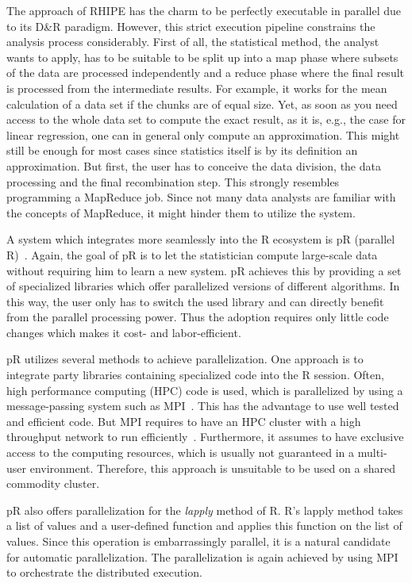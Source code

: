 The approach of RHIPE has the charm to be perfectly executable in parallel due to its D\&R paradigm.
However, this strict execution pipeline constrains the analysis process considerably.
First of all, the statistical method, the analyst wants to apply, has to be suitable to be split up into a map phase where subsets of the data are processed independently and a reduce phase where the final result is processed from the intermediate results.
For example, it works for the mean calculation of a data set if the chunks are of equal size.
Yet, as soon as you need access to the whole data set to compute the exact result, as it is, e.g., the case for linear regression, one can in general only compute an approximation.
This might still be enough for most cases since statistics itself is by its definition an approximation.
But first, the user has to conceive the data division, the data processing and the final recombination step.
This strongly resembles programming a MapReduce job.
Since not many data analysts are familiar with the concepts of MapReduce, it might hinder them to utilize the system.

A system which integrates more seamlessly into the R ecosystem is pR (parallel R)~\cite{samatova:2009a}.
Again, the goal of pR is to let the statistician compute large-scale data without requiring him to learn a new system.
pR achieves this by providing a set of specialized libraries which offer parallelized versions of different algorithms.
In this way, the user only has to switch the used library and can directly benefit from the parallel processing power.
Thus the adoption requires only little code changes which makes it cost- and labor-efficient.

pR utilizes several methods to achieve parallelization.
One approach is to integrate  party libraries containing specialized code into the R session.
Often, high performance computing (HPC) code is used, which is parallelized by using a message-passing system such as MPI~\cite{gropp:pc1996a,lusk:2009a}.
This has the advantage to use well tested and efficient code.
But MPI requires to have an HPC cluster with a high throughput network to run efficiently~\cite{sur:2006a}.
Furthermore, it assumes to have exclusive access to the computing resources, which is usually not guaranteed in a multi-user environment.
Therefore, this approach is unsuitable to be used on a shared commodity cluster.

pR also offers parallelization for the \emph{lapply} method of R.
R's lapply method takes a list of values and a user-defined function and applies this function on the list of values.
Since this operation is embarrassingly parallel, it is a natural candidate for automatic parallelization.
The parallelization is again achieved by using MPI to orchestrate the distributed execution.

